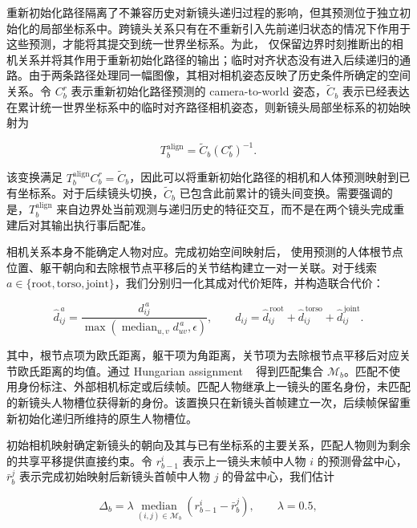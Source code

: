 重新初始化路径隔离了不兼容历史对新镜头递归过程的影响，但其预测位于独立初始化的局部坐标系中。跨镜头关系只有在不重新引入先前递归状态的情况下作用于这些预测，才能将其提交到统一世界坐标系。为此，\method{} 仅保留边界时刻推断出的相机关系并将其作用于重新初始化路径的输出；临时对齐状态没有进入后续递归的通路。由于两条路径处理同一幅图像，其相对相机姿态反映了历史条件所确定的空间关系。令 $C_b^r$ 表示重新初始化路径预测的 camera-to-world 姿态，$\widetilde C_b$ 表示已经表达在累计统一世界坐标系中的临时对齐路径相机姿态，则新镜头局部坐标系的初始映射为

\begin{equation}
 T_b^{\mathrm{align}}=\widetilde C_b(C_b^r)^{-1}.
 \label{eq:inter-shot-alignment-zh}
\end{equation}

该变换满足 $T_b^{\mathrm{align}}C_b^r=\widetilde C_b$，因此可以将重新初始化路径的相机和人体预测映射到已有坐标系。对于后续镜头切换，$\widetilde C_b$ 已包含此前累计的镜头间变换。需要强调的是，$T_b^{\mathrm{align}}$ 来自边界处当前观测与递归历史的特征交互，而不是在两个镜头完成重建后对其输出执行事后配准。

相机关系本身不能确定人物对应。完成初始空间映射后，\method{} 使用预测的人体根节点位置、躯干朝向和去除根节点平移后的关节结构建立一对一关联。对于线索 $a\in\{\mathrm{root},\mathrm{torso},\mathrm{joint}\}$，我们分别归一化其成对代价矩阵，并构造联合代价：

\begin{equation}
 \widehat d_{ij}^{\,a}=
 \frac{d_{ij}^{\,a}}
 {\max\!\left(\operatorname{median}_{u,v}d_{uv}^{\,a},\epsilon\right)},
 \qquad
 d_{ij}=\widehat d_{ij}^{\,\mathrm{root}}
       +\widehat d_{ij}^{\,\mathrm{torso}}
       +\widehat d_{ij}^{\,\mathrm{joint}}.
 \label{eq:association-cost-zh}
\end{equation}

其中，根节点项为欧氏距离，躯干项为角距离，关节项为去除根节点平移后对应关节欧氏距离的均值。通过 Hungarian assignment
~\citep{munkres1957assignment}
得到匹配集合 $\mathcal M_b$。匹配不使用身份标注、外部相机标定或后续帧。匹配人物继承上一镜头的匿名身份，未匹配的新镜头人物槽位获得新的身份。该置换只在新镜头首帧建立一次，后续帧保留重新初始化递归所维持的原生人物槽位。

初始相机映射确定新镜头的朝向及其与已有坐标系的主要关系，匹配人物则为剩余的共享平移提供直接约束。令 $r_{b-1}^i$ 表示上一镜头末帧中人物 $i$ 的预测骨盆中心，$\bar r_b^j$ 表示完成初始映射后新镜头首帧中人物 $j$ 的骨盆中心，我们估计

\begin{equation}
 \Delta_b=\lambda\underset{(i,j)\in\mathcal M_b}{\operatorname{median}}
 (r_{b-1}^i-\bar r_b^j),\qquad \lambda=0.5,
 \label{eq:shared-translation-zh}
\end{equation}

